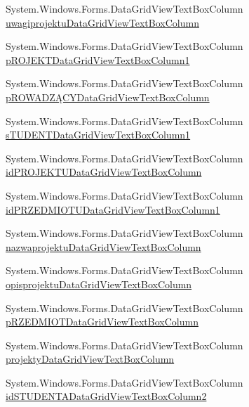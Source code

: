 \begin{DoxyCompactItemize}
\item 
System.\+Windows.\+Forms.\+Data\+Grid\+View\+Text\+Box\+Column \hyperlink{class_dziennik_ocen_1_1_form_admin_aa341fdd2dc8d4bbd2cd2c7507659d1be}{uwagiprojektu\+Data\+Grid\+View\+Text\+Box\+Column}
\item 
System.\+Windows.\+Forms.\+Data\+Grid\+View\+Text\+Box\+Column \hyperlink{class_dziennik_ocen_1_1_form_admin_a087289edfa65048d97c755990d69d888}{p\+R\+O\+J\+E\+K\+T\+Data\+Grid\+View\+Text\+Box\+Column1}
\item 
System.\+Windows.\+Forms.\+Data\+Grid\+View\+Text\+Box\+Column \hyperlink{class_dziennik_ocen_1_1_form_admin_ae8a41e16c66289a859a7e055a4bfdaff}{p\+R\+O\+W\+A\+D\+ZĄ\+C\+Y\+Data\+Grid\+View\+Text\+Box\+Column}
\item 
System.\+Windows.\+Forms.\+Data\+Grid\+View\+Text\+Box\+Column \hyperlink{class_dziennik_ocen_1_1_form_admin_aa3f656e0a43ec42e4360d5bb67ffe0e0}{s\+T\+U\+D\+E\+N\+T\+Data\+Grid\+View\+Text\+Box\+Column1}
\item 
System.\+Windows.\+Forms.\+Data\+Grid\+View\+Text\+Box\+Column \hyperlink{class_dziennik_ocen_1_1_form_admin_a99a7ea058c945554d9165056687bc3a7}{id\+P\+R\+O\+J\+E\+K\+T\+U\+Data\+Grid\+View\+Text\+Box\+Column}
\item 
System.\+Windows.\+Forms.\+Data\+Grid\+View\+Text\+Box\+Column \hyperlink{class_dziennik_ocen_1_1_form_admin_ad35482b5eb4ba1ea7241a6cb83155e9c}{id\+P\+R\+Z\+E\+D\+M\+I\+O\+T\+U\+Data\+Grid\+View\+Text\+Box\+Column1}
\item 
System.\+Windows.\+Forms.\+Data\+Grid\+View\+Text\+Box\+Column \hyperlink{class_dziennik_ocen_1_1_form_admin_a9917716fd8b31205ca04f892f6973a3e}{nazwaprojektu\+Data\+Grid\+View\+Text\+Box\+Column}
\item 
System.\+Windows.\+Forms.\+Data\+Grid\+View\+Text\+Box\+Column \hyperlink{class_dziennik_ocen_1_1_form_admin_a4e784a85cb96c95d2295d6106268792f}{opisprojektu\+Data\+Grid\+View\+Text\+Box\+Column}
\item 
System.\+Windows.\+Forms.\+Data\+Grid\+View\+Text\+Box\+Column \hyperlink{class_dziennik_ocen_1_1_form_admin_a8888f586a33e8fa383b5fd20947acf53}{p\+R\+Z\+E\+D\+M\+I\+O\+T\+Data\+Grid\+View\+Text\+Box\+Column}
\item 
System.\+Windows.\+Forms.\+Data\+Grid\+View\+Text\+Box\+Column \hyperlink{class_dziennik_ocen_1_1_form_admin_acd8b38a410aab8b25bb1e5fa9077b056}{projekty\+Data\+Grid\+View\+Text\+Box\+Column}
\item 
System.\+Windows.\+Forms.\+Data\+Grid\+View\+Text\+Box\+Column \hyperlink{class_dziennik_ocen_1_1_form_admin_add0f83e810a64b6633a7681fb590a232}{id\+S\+T\+U\+D\+E\+N\+T\+A\+Data\+Grid\+View\+Text\+Box\+Column2}

\end{DoxyCompactItemize}

